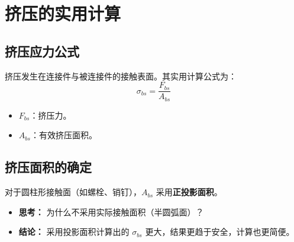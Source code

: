 \section{挤压的实用计算}

\subsection{挤压应力公式}
挤压发生在连接件与被连接件的接触表面。其实用计算公式为：
\begin{equation}
    \sigma_{bs} = \frac{F_{bs}}{A_{bs}}
\end{equation}
\begin{itemize}
    \item $F_{bs}$：挤压力。
    \item $A_{bs}$：有效挤压面积。
\end{itemize}

\subsection{挤压面积的确定}
对于圆柱形接触面（如螺栓、销钉），$A_{bs}$ 采用\textbf{正投影面积}。
\begin{itemize}
    \item \textbf{思考：} 为什么不采用实际接触面积（半圆弧面）？
    \item \textbf{结论：} 采用投影面积计算出的 $\sigma_{bs}$ 更大，结果更趋于安全，计算也更简便。
\end{itemize}


